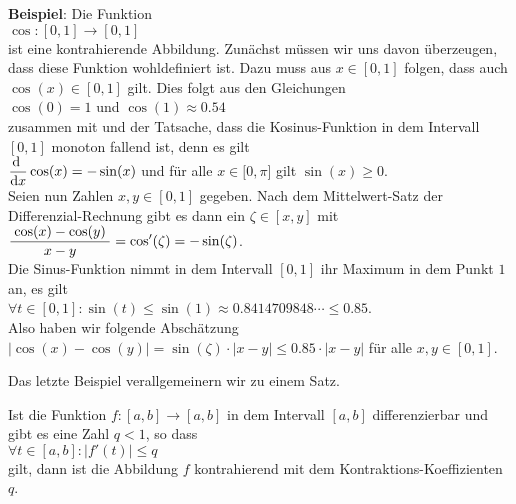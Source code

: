 \noindent
\textbf{Beispiel}: Die Funktion
\\[0.2cm]
\hspace*{1.3cm}
$\cos:[0,1] \rightarrow [0,1]$
\\[0.2cm]
ist eine kontrahierende Abbildung.  
Zun\"achst m\"ussen wir uns davon \"uberzeugen, dass diese Funktion wohldefiniert ist.
Dazu muss aus $x\in[0,1]$ folgen, dass auch $\cos(x) \in [0,1]$ gilt.  Dies folgt aus den
Gleichungen
\\[0.2cm]
\hspace*{1.3cm}
$\cos(0) = 1$ \quad und \quad $\cos(1) \approx 0.54$ 
\\[0.2cm]
zusammen mit und der Tatsache, dass die Kosinus-Funktion in dem Intervall
$[0,1]$ monoton fallend ist, denn es gilt
\\[0.2cm]
\hspace*{1.3cm}
 $\displaystyle\frac{\textrm{d}\;}{\textrm{d}x} \cos(x) = -\sin(x)$  \quad und f\"ur alle $x \in \bigl[0,\pi\bigr]$ gilt $\sin(x) \geq 0$.
\\[0.2cm]
 Seien nun Zahlen $x,y\in[0,1]$ gegeben. 
Nach dem Mittelwert-Satz der Differenzial-Rechnung gibt es dann ein $\zeta\in[x,y]$ mit 
\\[0.2cm]
\hspace*{1.3cm} $\displaystyle\frac{\;\displaystyle\cos(x) - \cos(y)\;}{\;\displaystyle x - y\;} = \cos'(\zeta) = - \sin(\zeta)$.
\\[0.2cm]
Die Sinus-Funktion nimmt in dem Intervall $[0,1]$ ihr Maximum in dem Punkt $1$ an, es gilt
\\[0.2cm]
\hspace*{1.3cm} $\forall t \in [0,1]: \sin(t) \leq \sin(1) \approx 0.8414709848\cdots \leq 0.85$.
\\[0.2cm]
Also haben wir folgende Absch\"atzung
\\[0.2cm]
\hspace*{1.3cm}
$|\cos(x) - \cos(y)| = \sin(\zeta) \cdot  |x - y| \leq 0.85 \cdot  |x - y|$ \quad f\"ur alle $x,y\in[0,1]$.
\eox
\vspace*{0.2cm}

\noindent
Das letzte Beispiel verallgemeinern wir zu einem Satz.
\pagebreak

\begin{Satz}
Ist die Funktion $f:[a,b] \rightarrow [a,b]$ in dem Intervall $[a,b]$ differenzierbar und gibt es eine Zahl
$q < 1$, so dass
\\[0.2cm]
\hspace*{1.3cm}
$\forall t \in [a,b]: |f'(t)| \leq q$
\\[0.2cm]
gilt, dann ist die Abbildung $f$ kontrahierend mit dem Kontraktions-Koeffizienten $q$.
\end{Satz}

